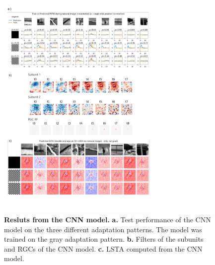 \begin{figure}
    \centering
    \includegraphics[width=0.7\textwidth]{pics/CNNResults.png}
    \caption{\textbf{Resluts from the CNN model.} \textbf{a.} Test performance of the CNN model on the three different adaptation patterns. The model was trained on the gray adaptation pattern. \textbf{b.} Filters of the subunits and RGCs of the CNN model. \textbf{c.} LSTA computed from the CNN model.}
    \label{fig:CNNResults}
\end{figure}